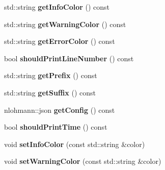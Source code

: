 \begin{DoxyCompactItemize}
\item 
\hypertarget{classProjectPrinter_a47e845c830d99db901cbc08946103972}{std\-::string {\bfseries get\-Info\-Color} () const }\label{classProjectPrinter_a47e845c830d99db901cbc08946103972}

\item 
\hypertarget{classProjectPrinter_ab82129adc21c9b5dbc2a4564b1fc1870}{std\-::string {\bfseries get\-Warning\-Color} () const }\label{classProjectPrinter_ab82129adc21c9b5dbc2a4564b1fc1870}

\item 
\hypertarget{classProjectPrinter_a26a53895827336ba4e9f3084f10bb4e9}{std\-::string {\bfseries get\-Error\-Color} () const }\label{classProjectPrinter_a26a53895827336ba4e9f3084f10bb4e9}

\item 
\hypertarget{classProjectPrinter_a02412d457886ed2180f20be11d688d1a}{bool {\bfseries should\-Print\-Line\-Number} () const }\label{classProjectPrinter_a02412d457886ed2180f20be11d688d1a}

\item 
\hypertarget{classProjectPrinter_a0ef0ceef95324cc2513fc475fd6f5581}{std\-::string {\bfseries get\-Prefix} () const }\label{classProjectPrinter_a0ef0ceef95324cc2513fc475fd6f5581}

\item 
\hypertarget{classProjectPrinter_af2f44028489ed747d5c22a5e4c4c4b6f}{std\-::string {\bfseries get\-Suffix} () const }\label{classProjectPrinter_af2f44028489ed747d5c22a5e4c4c4b6f}

\item 
\hypertarget{classProjectPrinter_a7ad3708cde5806977da298591f12a747}{nlohmann\-::json {\bfseries get\-Config} () const }\label{classProjectPrinter_a7ad3708cde5806977da298591f12a747}

\item 
\hypertarget{classProjectPrinter_afb3cb322b526bc2140ddb581d1c6db25}{bool {\bfseries should\-Print\-Time} () const }\label{classProjectPrinter_afb3cb322b526bc2140ddb581d1c6db25}

\item 
\hypertarget{classProjectPrinter_aa928801da0b7f7cd682cf4ef83860905}{void {\bfseries set\-Info\-Color} (const std\-::string \&color)}\label{classProjectPrinter_aa928801da0b7f7cd682cf4ef83860905}

\item 
\hypertarget{classProjectPrinter_ab0758201372a45c3d27b6dacb3a9456d}{void {\bfseries set\-Warning\-Color} (const std\-::string \&color)}\label{classProjectPrinter_ab0758201372a45c3d27b6dacb3a9456d}


\end{DoxyCompactItemize}
